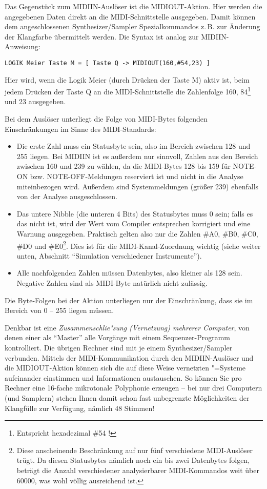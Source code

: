 Das Gegenstück zum MIDIIN-Auslöser ist die MIDIOUT-Aktion. Hier
werden die angegebenen Daten direkt an die
MIDI-Schnittstelle ausgegeben. Damit können dem angeschlossenen
Synthesizer/Sampler Spezialkommandos z.\,B. zur Änderung der
Klangfarbe übermittelt werden. Die Syntax ist analog zur
MIDIIN-Anweisung:
\begin{verbatim}
LOGIK Meier Taste M = [ Taste Q -> MIDIOUT(160,#54,23) ]
\end{verbatim}
Hier wird, wenn die Logik Meier (durch Drücken der Taste M) aktiv ist, 
beim jedem Drücken der Taste Q an die MIDI-Schnittstelle die 
Zahlenfolge 160, 84\footnote{Entspricht hexadezimal \#54 !} 
und 23 ausgegeben.

Bei dem Auslöser  unterliegt die Folge von MIDI-Bytes
folgenden Einschränkungen 
im Sinne des MIDI-Stan\-dards:
\begin{itemize}
\item Die erste Zahl muss ein Statusbyte sein, also im Bereich zwischen
  128 und 255 liegen. Bei MIDIIN ist es außerdem nur sinnvoll, Zahlen
  aus den Bereich zwischen 160 und 239 zu wählen, da die MIDI-Bytes
  128 bis 159 für NOTE-ON bzw. NOTE-OFF-Meldungen reserviert ist und
  nicht in die Analyse miteinbezogen wird. Außerdem sind
  Systemmeldungen  (größer 239) ebenfalls von
  der Analyse ausgeschlossen.
\item Das untere Nibble (die unteren 4 Bits) des Statusbytes muss 0
  sein; falls es das nicht ist, wird der Wert vom Compiler entsprechen
  korrigiert und eine Warnung ausgegeben. Praktisch gelten also nur
  die Zahlen \#A0, \#B0, \#C0, \#D0 und \#E0\footnote{Diese
    anscheinende Beschränkung auf nur fünf verschiedene MIDI-Auslöser
    trügt. Da diesen Statusbytes nämlich noch ein bis zwei Datenbytes
    folgen, beträgt die Anzahl verschiedener analysierbarer
    MIDI-Kommandos weit über 60000, was wohl völlig ausreichend ist.}.
  Dies ist für die MIDI-Kanal-Zuordnung wichtig (siehe weiter unten,
  Abschnitt "`Simulation verschiedener Instrumente"').
\item Alle nachfolgenden Zahlen müssen Datenbytes, also kleiner als
  128 sein. Negative Zahlen sind als MIDI-Byte natürlich nicht
  zulässig.
\end{itemize}

Die Byte-Folgen bei der Aktion  unterliegen nur der
Einschränkung, dass sie im Bereich von 0 -- 255 liegen müssen.

Denkbar ist eine \emph{Zusammenschlie"sung (Vernetzung) mehrerer Computer}, 
von denen einer als "`Master"' alle Vorgänge mit einem Sequenzer-Programm 
kontrolliert. Die übrigen Rechner sind mit je einem Synthesizer/Sampler 
verbunden. Mittels der MIDI-Kommunikation durch den MIDIIN-Auslöser 
und die MIDIOUT-Aktion können sich die auf diese Weise vernetzten 
\mutabor{}"=Systeme aufeinander einstimmen und Informationen austauschen. 
So können Sie pro Rechner eine 16-fache mikrotonale Polyphonie erzeugen 
-- bei nur drei Computern (und Samplern) stehen Ihnen damit schon fast 
unbegrenzte Möglichkeiten der Klangfülle zur Verfügung, nämlich 48 Stimmen!

